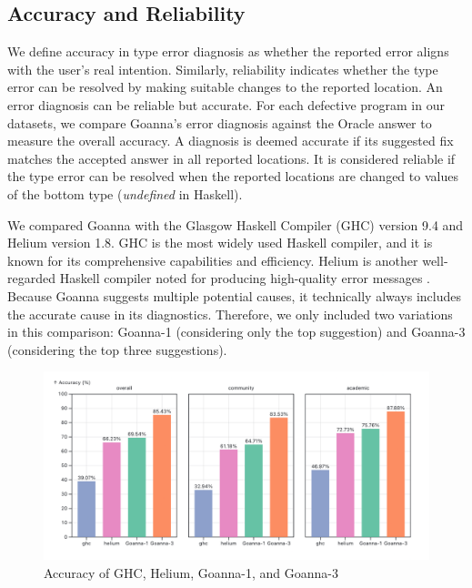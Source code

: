 \documentclass[pdflatex,lineno,sn-nature,Numbered]{sn-jnl}%
\begin{document}
\subsection{Accuracy and Reliability} \label{sub:eval-accuracy}

We define accuracy in type error diagnosis as whether the reported error aligns with the user's real intention. Similarly, reliability indicates whether the type error can be resolved by making suitable changes to the reported location. An error diagnosis can be reliable but accurate. For each defective program in our datasets, we compare Goanna's error diagnosis against the Oracle answer to measure the overall accuracy. A diagnosis is deemed accurate if its suggested fix matches the accepted answer in all reported locations. It is considered reliable if the type error can be resolved when the reported locations are changed to values of the bottom type (\textit{undefined} in Haskell).

We compared Goanna with the Glasgow Haskell Compiler (GHC) version 9.4 \cite{Gamari_undated-zu} and Helium \cite{Hage2023-kk} version 1.8. GHC is the most widely used Haskell compiler, and it is known for its comprehensive capabilities and efficiency. Helium is another well-regarded Haskell compiler noted for producing high-quality error messages \cite{Heeren2003-kd}. Because Goanna suggests multiple potential causes, it technically always includes the accurate cause in its diagnostics. Therefore, we only included two variations in this comparison: Goanna-1 (considering only the top suggestion) and Goanna-3 (considering the top three suggestions).

    \begin{figure}
        \centering
        \includegraphics[width=\linewidth]{images/accuracy.png}
        \caption{Accuracy of GHC, Helium, Goanna-1, and Goanna-3} 
        \label{fig:accuracy}
    \end{figure}
\end{document}
